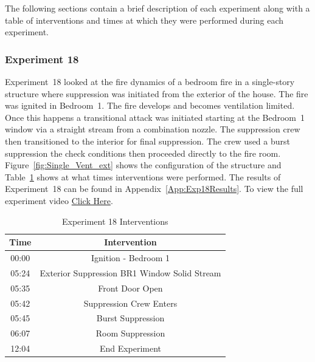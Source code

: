 \documentclass[12pt,oneside]{book}
\begin{document}
The following sections contain a brief description of each experiment along with a table of interventions and times at which they were performed during each experiment. 

\FloatBarrier

\subsubsection{Experiment 18}
Experiment~18 looked at the fire dynamics of a bedroom fire in a single-story structure where suppression was initiated from the exterior of the house. The fire was ignited in Bedroom~1. The fire develops and becomes ventilation limited. Once this happens a transitional attack was initiated starting at the Bedroom~1 window via a straight stream from a combination nozzle.  The suppression crew then transitioned to the interior for final suppression. The crew used a burst suppression the check conditions then proceeded directly to the fire room. Figure~\ref{fig:Single_Vent_ext} shows the configuration of the structure and Table~\ref{Table:Exp18Interventions} shows at what times interventions were performed. The results of Experiment~18 can be found in Appendix~\ref{App:Exp18Results}. To view the full experiment video \href{https://player.vimeo.com/video/170499622?autoplay=1}{Click Here}.

\begin{table}[H]
	\centering
	\caption{Experiment 18 Interventions}
	\begin{tabular}{|c|c|} 
		\hline
		Time & Intervention \\ \hline \hline
		00:00 & Ignition - Bedroom 1 \\ \hline
		05:24 & Exterior Suppression BR1 Window Solid Stream \\ \hline
		05:35 & Front Door Open \\ \hline
		05:42 & Suppression Crew Enters\\ \hline
		05:45 & Burst Suppression \\ \hline 
		06:07 & Room Suppression \\ \hline
		12:04 & End Experiment\\ \hline
	\end{tabular}
	\label{Table:Exp18Interventions}
\end{table}

\FloatBarrier
\end{document}
